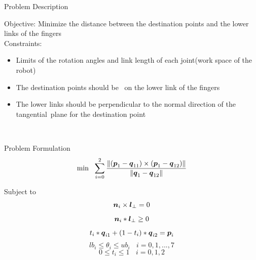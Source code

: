 \documentclass[10pt, compress]{beamer}
\begin{document}
\begin{frame}[fragile] {Problem Description} 

Objective: Minimize the distance between the destination points and the lower links of the fingers \\
	
Constraints: 
\begin{itemize}
\item Limits of the rotation angles and link length of each joint(work space of the  robot)
\item	The destination points should be  on the lower link of the fingers
\item	The lower links should be perpendicular to the normal direction of the tangential plane for the destination point
\end{itemize} 	
	
\end{frame}



\begin{frame}[fragile] {Problem Formulation} 
\[
\min \ \  \sum_{i=0}^{2} \frac{\|(\pb_1-\qb_{11})\times (\pb_1-\qb_{12}) \|}{\|\qb_1-\qb_{12}\|}
\]

Subject to 
\[
\mbox{\boldmath $n$}_i \times \mbox{\boldmath $l$}_\bot =0
\]
\[
\mbox{\boldmath $n$}_i * \mbox{\boldmath $l$}_\bot \geq 0
\]
\[
 t_i* \mbox{\boldmath $q$}_{i1} +(1-t_i) * \mbox{\boldmath $q$}_{i2} = \mbox{\boldmath $p$}_i
\]
\[
lb_i \leq \theta_i \leq ub_i  \ \ \ \     i=0, 1, ..., 7
\]
\[
0 \leq t_i  \leq 1    \ \ \ \     i=0, 1, 2
\]

\end{frame}


\begin{frame}
	
\end{frame}
\end{document}
